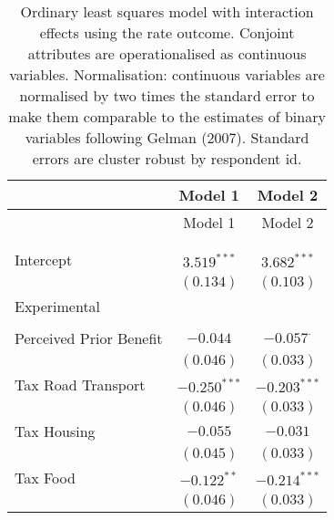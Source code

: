 
\begin{center}
\begin{tiny}
\begin{longtable}{l@{} c@{} c@{}}
\hline
 & Model 1 & Model 2 \\
\hline
\endfirsthead
\hline
 & Model 1 & Model 2 \\
\hline
\endhead
\hline
\endfoot
\hline
\multicolumn{3}{l}{\tiny{$^{***}p<0.001$; $^{**}p<0.01$; $^{*}p<0.05$; $^{\cdot}p<0.1$}}\\
\caption{Ordinary least squares model with interaction effects using the rate outcome. Conjoint attributes are operationalised as continuous variables. Normalisation: continuous variables are normalised by two times
               the standard error to make them comparable to the estimates of binary variables following Gelman (2007). Standard errors are cluster robust by respondent id.}
\label{table:linear_interactions_exp_continuous}
\endlastfoot \\
Intercept                                                & $3.519^{***}$    & $3.682^{***}$    \\
                                                         & $(0.134)$        & $(0.103)$        \\
Experimental                                             &                  &                  \\
                                                         &                  &                  \\
\quad Perceived Prior Benefit                            & $-0.044$         & $-0.057^{\cdot}$ \\
                                                         & $(0.046)$        & $(0.033)$        \\
\quad Tax Road Transport                                 & $-0.250^{***}$   & $-0.203^{***}$   \\
                                                         & $(0.046)$        & $(0.033)$        \\
\quad Tax Housing                                        & $-0.055$         & $-0.031$         \\
                                                         & $(0.045)$        & $(0.033)$        \\
\quad Tax Food                                           & $-0.122^{**}$    & $-0.214^{***}$   \\
                                                         & $(0.046)$        & $(0.033)$        \\

\end{longtable}
\end{tiny}
\end{center}
